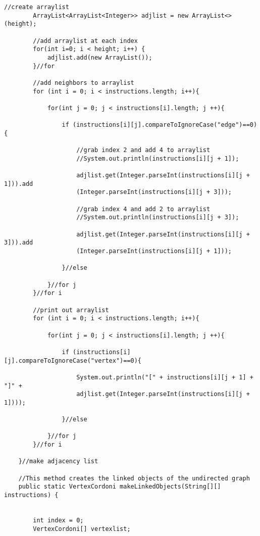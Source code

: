 \documentclass[letterpaper, 10pt,DIV=13]{scrartcl}
\numberwithin{equation}{section} %
\numberwithin{figure}{section} %
\numberwithin{table}{section} %
\begin{document}
\begin{lstlisting}[frame=single, ]
        //create arraylist
        ArrayList<ArrayList<Integer>> adjlist = new ArrayList<>(height);

        //add arraylist at each index
        for(int i=0; i < height; i++) {
            adjlist.add(new ArrayList());
        }//for

        //add neighbors to arraylist
        for (int i = 0; i < instructions.length; i++){

            for(int j = 0; j < instructions[i].length; j ++){

                if (instructions[i][j].compareToIgnoreCase("edge")==0){
                    
                    //grab index 2 and add 4 to arraylist
                    //System.out.println(instructions[i][j + 1]);
        
                    adjlist.get(Integer.parseInt(instructions[i][j + 1])).add
                    (Integer.parseInt(instructions[i][j + 3]));
        
                    //grab index 4 and add 2 to arraylist
                    //System.out.println(instructions[i][j + 3]);
        
                    adjlist.get(Integer.parseInt(instructions[i][j + 3])).add
                    (Integer.parseInt(instructions[i][j + 1]));
                    
                }//else
            
            }//for j
        }//for i

        //print out arraylist
        for (int i = 0; i < instructions.length; i++){

            for(int j = 0; j < instructions[i].length; j ++){

                if (instructions[i][j].compareToIgnoreCase("vertex")==0){

                    System.out.println("[" + instructions[i][j + 1] + "]" + 
                    adjlist.get(Integer.parseInt(instructions[i][j + 1])));

                }//else
            
            }//for j
        }//for i

    }//make adjacency list

    //This method creates the linked objects of the undirected graph
    public static VertexCordoni makeLinkedObjects(String[][] instructions) {

        
        int index = 0;
        VertexCordoni[] vertexlist;
        

\end{lstlisting}
\end{document}
